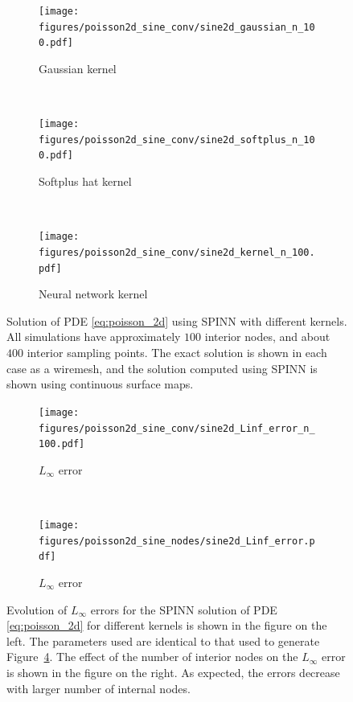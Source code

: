 \documentclass[12pt]{article}
\begin{document}
\begin{figure}
\begin{subfigure}{0.32\textwidth}
\centering
\texttt{[image: figures/poisson2d\_sine\_conv/sine2d\_gaussian\_n\_100.pdf]}
\caption{Gaussian kernel}
\label{fig:2d_A_gaussian_n_100}
\end{subfigure}
~
\begin{subfigure}{0.32\textwidth}
\centering
\texttt{[image: figures/poisson2d\_sine\_conv/sine2d\_softplus\_n\_100.pdf]}
\caption{Softplus hat kernel}
\label{fig:2d_A_softplus_n_100_a}
\end{subfigure}
~
\begin{subfigure}{0.32\textwidth}
\centering
\texttt{[image: figures/poisson2d\_sine\_conv/sine2d\_kernel\_n\_100.pdf]}
\caption{Neural network kernel}
\label{fig:2d_A_kernel_n_100}
\end{subfigure}
\caption{Solution of PDE \eqref{eq:poisson_2d} using SPINN with different kernels. All simulations have approximately $100$ interior nodes, and about $400$ interior sampling points. The exact solution is shown in each case as a wiremesh, and the solution computed using SPINN is shown using continuous surface maps.}
\label{fig:spinn_poisson_2d}
\end{figure}

\begin{figure}
\begin{subfigure}{0.48\textwidth}
\centering
\texttt{[image: figures/poisson2d\_sine\_conv/sine2d\_Linf\_error\_n\_100.pdf]}
\caption{$L_{\infty}$ error}
\label{fig:poisson_2d_Linf_n_100}
\end{subfigure}
~
\begin{subfigure}{0.48\textwidth}
\centering
\texttt{[image: figures/poisson2d\_sine\_nodes/sine2d\_Linf\_error.pdf]}
\caption{$L_{\infty}$ error}
\label{fig:poisson_2d_Linf_nodes}
\end{subfigure}
\caption{Evolution of $L_\infty$ errors for the SPINN solution of PDE \eqref{eq:poisson_2d} for different kernels is shown in the figure on the left. The parameters used are identical to that used to generate Figure~\ref{fig:spinn_poisson_2d}. The effect of the number of interior nodes on the $L_\infty$ error is shown in the figure on the right. As expected, the errors decrease with larger number of internal nodes.}
\label{fig:poisson_2d_error}
\end{figure}
\end{document}
